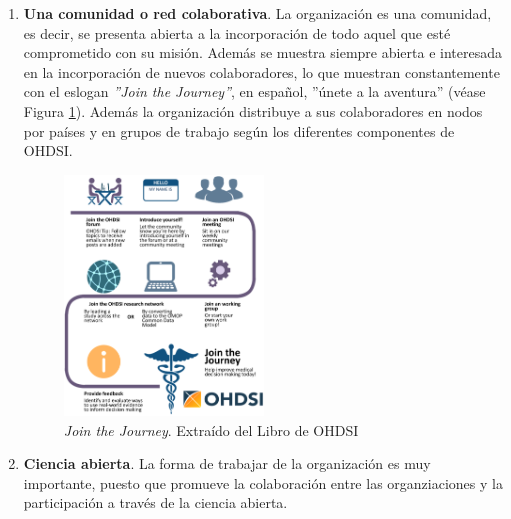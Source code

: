 \begin{enumerate}[label=\roman*.]
    \item \textbf{Una comunidad o red colaborativa}. La organización es una comunidad, es decir, se presenta abierta a la incorporación de todo aquel que esté comprometido con su misión. Además se muestra siempre abierta e interesada en la incorporación de nuevos colaboradores, lo que muestran constantemente con el eslogan \textit{''Join the Journey''}, en español, ''únete a la aventura'' (véase Figura \ref{fig:joinTheJourney}). Además la organización distribuye a sus colaboradores en nodos por países y en grupos de trabajo según los diferentes componentes de OHDSI. 
    
\begin{figure}[H]
    \centering
    \includegraphics[width=0.50\textwidth]{figures/joinTheJourney.png}
     \caption{\textit{Join the Journey}. Extraído del Libro de OHDSI \cite{OHDSIbook}}
    \label{fig:joinTheJourney}
\end{figure}
    

    \item \textbf{Ciencia abierta}. La forma de trabajar de la organización es muy importante, puesto que promueve la colaboración entre las organziaciones y la participación a través de la ciencia abierta.


\end{enumerate}
